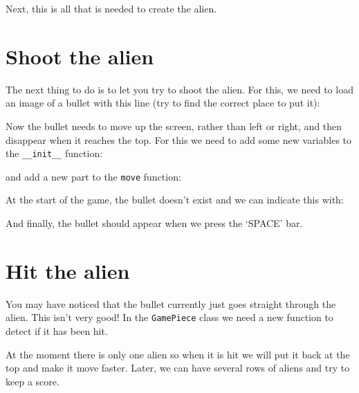 \documentclass{article}
\newcommand{\pythonscript}[2]{
\begin{itemize}
\item[]
\end{itemize}
}
\begin{document}

Next, this is all that is needed to create the alien.



\section{Shoot the alien}

The next thing to do is to let you try to shoot the alien. For this, we need
to load an image of a bullet with this line (try to find the correct place to
put it):


Now the bullet needs to move up the screen, rather than left or right, and
then disappear when it reaches the top. For this we need to add some new
variables to the \texttt{\_\_init\_\_} function:


and add a new part to the \texttt{move} function:


At the start of the game, the bullet doesn't exist and we can indicate this
with:


And finally, the bullet should appear when we press the `SPACE' bar.


\section{Hit the alien}

You may have noticed that the bullet currently just goes straight through the
alien. This isn't very good! In the \texttt{GamePiece} class we need a new
function to detect if it has been hit.


At the moment there is only one alien so when it is hit we will put it back
at the top and make it move faster. Later, we can have several rows of aliens
and try to keep a score.

\end{document}
